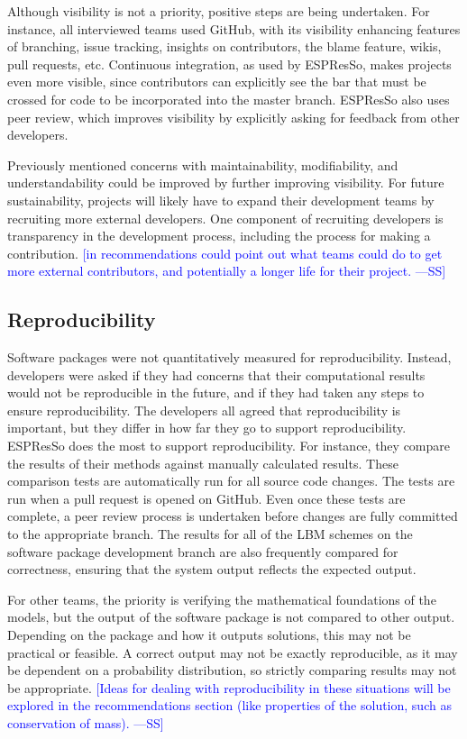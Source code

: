 \documentclass[final, 3p, times, authoryear]{elsarticle}
\newcommand{\authornote}[3]{\textcolor{#1}{[#3 ---#2]}}
\newcommand{\authornote}[3]{}
\newcommand{\wss}[1]{\authornote{blue}{SS}{#1}} %
\begin{document}
Although visibility is not a priority, positive steps are being undertaken. For
instance, all interviewed teams used GitHub, with its visibility enhancing
features of branching, issue tracking, insights on contributors, the blame
feature, wikis, pull requests, etc. Continuous integration, as used by ESPResSo,
makes projects even more visible, since contributors can explicitly see the bar
that must be crossed for code to be incorporated into the master branch.
ESPResSo also uses peer review, which improves visibility by explicitly asking
for feedback from other developers.

Previously mentioned concerns with maintainability, modifiability, and
understandability  could be improved by further improving visibility.  For
future sustainability, projects will likely have to expand their development
teams by recruiting more external developers. One component of recruiting
developers is transparency in the development process, including the process for
making a contribution.  \wss{in recommendations could point out what teams could
do to get more external contributors, and potentially a longer life for their
project.}

\subsection{Reproducibility} \label{SecReproducibility}

Software packages were not quantitatively measured for reproducibility. Instead,
developers were asked if they had concerns that their computational results
would not be reproducible in the future, and if they had taken any steps to
ensure reproducibility.  The developers all agreed that reproducibility is
important, but they differ in how far they go to support reproducibility.
ESPResSo does the most to support reproducibility.  For instance, they compare
the results of their methods against manually calculated results. These
comparison tests are automatically run for all source code changes. The tests
are run when a pull request is opened on GitHub. Even once these tests are
complete, a peer review process is undertaken before changes are fully committed
to the appropriate branch. The results for all of the LBM schemes on the
software package development branch are also frequently compared for
correctness, ensuring that the system output reflects the expected output.  

For other teams, the priority is verifying the mathematical foundations of the
models, but the output of the software package is not compared to other output.
Depending on the package and how it outputs solutions, this may not be practical
or feasible. A correct output may not be exactly reproducible, as it may be
dependent on a probability distribution, so strictly comparing results may not
be appropriate. \wss{Ideas for dealing with reproducibility in these situations
will be explored in the recommendations section (like properties of the solution,
such as conservation of mass).}
\end{document}
